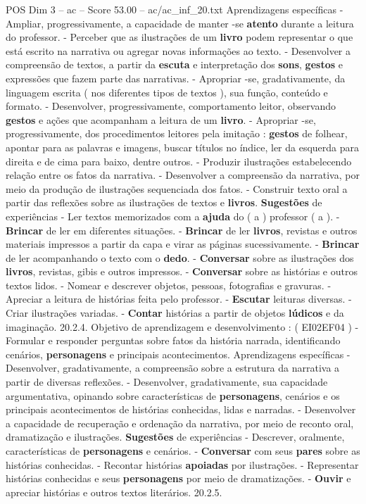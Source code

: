 \begin{textsample}{POS Dim 3 – ac – Score 53.00 – ac/ac\_inf\_20.txt}
Aprendizagens específicas - Ampliar, progressivamente, a capacidade de manter -se \textbf{atento} durante a leitura do professor. - Perceber que as ilustrações de um \textbf{livro} podem representar o que está escrito na narrativa ou agregar novas informações ao texto. - Desenvolver a compreensão de textos, a partir da \textbf{escuta} e interpretação dos \textbf{sons}, \textbf{gestos} e expressões que fazem parte das narrativas. - Apropriar -se, gradativamente, da linguagem escrita ( nos diferentes tipos de textos ), sua função, conteúdo e formato. - Desenvolver, progressivamente, comportamento leitor, observando \textbf{gestos} e ações que acompanham a leitura de um \textbf{livro}. - Apropriar -se, progressivamente, dos procedimentos leitores pela imitação : \textbf{gestos} de folhear, apontar para as palavras e imagens, buscar títulos no índice, ler da esquerda para direita e de cima para baixo, dentre outros. - Produzir ilustrações estabelecendo relação entre os fatos da narrativa. - Desenvolver a compreensão da narrativa, por meio da produção de ilustrações sequenciada dos fatos. - Construir texto oral a partir das reflexões sobre as ilustrações de textos e \textbf{livros}. \textbf{Sugestões} de experiências - Ler textos memorizados com a \textbf{ajuda} do ( a ) professor ( a ). - \textbf{Brincar} de ler em diferentes situações. - \textbf{Brincar} de ler \textbf{livros}, revistas e outros materiais impressos a partir da capa e virar as páginas sucessivamente. - \textbf{Brincar} de ler acompanhando o texto com o \textbf{dedo}. - \textbf{Conversar} sobre as ilustrações dos \textbf{livros}, revistas, gibis e outros impressos. - \textbf{Conversar} sobre as histórias e outros textos lidos. - Nomear e descrever objetos, pessoas, fotografias e gravuras. - Apreciar a leitura de histórias feita pelo professor. - \textbf{Escutar} leituras diversas. - Criar ilustrações variadas. - \textbf{Contar} histórias a partir de objetos \textbf{lúdicos} e da imaginação. 20.2.4.
Objetivo de aprendizagem e desenvolvimento : ( EI02EF04 ) - Formular e responder perguntas sobre fatos da história narrada, identificando cenários, \textbf{personagens} e principais acontecimentos.
Aprendizagens específicas - Desenvolver, gradativamente, a compreensão sobre a estrutura da narrativa a partir de diversas reflexões. - Desenvolver, gradativamente, sua capacidade argumentativa, opinando sobre características de \textbf{personagens}, cenários e os principais acontecimentos de histórias conhecidas, lidas e narradas. - Desenvolver a capacidade de recuperação e ordenação da narrativa, por meio de reconto oral, dramatização e ilustrações. \textbf{Sugestões} de experiências - Descrever, oralmente, características de \textbf{personagens} e cenários. - \textbf{Conversar} com seus \textbf{pares} sobre as histórias conhecidas. - Recontar histórias \textbf{apoiadas} por ilustrações. - Representar histórias conhecidas e seus \textbf{personagens} por meio de dramatizações. - \textbf{Ouvir} e apreciar histórias e outros textos literários. 20.2.5.

\end{textsample}
